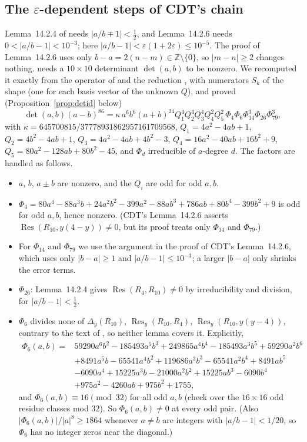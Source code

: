 \documentclass[11pt]{amsart}
\theoremstyle{definition}
\theoremstyle{remark}
\numberwithin{equation}{section}
\newcommand{\ZZ}{\mathbb{Z}}
\newcommand{\Res}{\operatorname{Res}}
\begin{document}
\subsection{The \texorpdfstring{$\varepsilon$}{epsilon}-dependent steps of CDT's chain}\label{sec:phi6}
Lemma~14.2.4 of \cite{CDT} needs $|a/b\mp1|<\frac12$, and Lemma~14.2.6 needs $0<|a/b-1|<10^{-3}$; here
$|a/b-1|<\varepsilon(1+2\varepsilon)\le10^{-5}$. The proof of Lemma~14.2.6 uses only $b-a=2(n-m)\in\ZZ\setminus\{0\}$, so
$|m-n|\ge2$ changes nothing. \cite[Lemma~14.3.1]{CDT} needs a $10\times10$ determinant $\det(a,b)$ to be nonzero. We
recomputed it exactly from the operator of \cite[Prop.~14.1.11]{CDT} and the reduction \cite[(14.3.2)--(14.3.5)]{CDT},
with numerators $S_k$ of the shape \cite[(14.3.6)]{CDT} (one for each basis vector of the unknown $Q$), and proved (Proposition~\ref{prop:detid} below)
\[
\det(a,b)(a-b)^{86}=\kappa\,a^6b^6(a+b)^{24}Q_1^4Q_2^4Q_3^4Q_4^2Q_5^2\,\Phi_4\Phi_6\Phi_{14}^3\Phi_{26}\Phi_{79}^3,
\]
with $\kappa=645700815/37778931862957161709568$, $Q_1=4a^2-4ab+1$, $Q_2=4b^2-4ab+1$, $Q_3=4a^2-4ab+4b^2-3$,
$Q_4=16a^2-40ab+16b^2+9$, $Q_5=80a^2-128ab+80b^2-45$, and $\Phi_d$ irreducible of $a$-degree $d$. The factors are handled as follows.
\begin{itemize}
\item $a$, $b$, $a\pm b$ are nonzero, and the $Q_i$ are odd for odd $a,b$.
\item $\Phi_4=80a^4-88a^3b+24a^2b^2-399a^2-88ab^3+786ab+80b^4-399b^2+9$ is odd for odd $a,b$, hence nonzero. (CDT's
Lemma~14.2.6 asserts $\Res(R_{10},y(4-y))\ne0$, but its proof treats only $\Phi_{14}$ and $\Phi_{79}$.)
\item For $\Phi_{14}$ and $\Phi_{79}$ we use the argument in the proof of CDT's Lemma~14.2.6, which uses only
$|b-a|\ge1$ and $|a/b-1|\le10^{-3}$; a larger $|b-a|$ only shrinks the error terms.
\item $\Phi_{26}$: Lemma~14.2.4 gives $\Res(R_4,R_{10})\ne0$ by irreducibility and division, for $|a/b-1|<\frac12$.
\item $\Phi_6$ divides none of $\Delta_y(R_{10})$, $\Res_y(R_{10},R_4)$, $\Res_y(R_{10},y(y-4))$, contrary to the text of
\cite{CDT}, so neither lemma covers it. Explicitly,
\[
\begin{aligned}
\Phi_6(a,b)={}&59290a^6b^2-185493a^5b^3+249865a^4b^4-185493a^3b^5+59290a^2b^6\\
&+8491a^5b-65541a^4b^2+119686a^3b^3-65541a^2b^4+8491ab^5\\
&-6090a^4+15225a^3b-21000a^2b^2+15225ab^3-6090b^4\\
&+975a^2-4260ab+975b^2+1755,
\end{aligned}
\]
and $\Phi_6(a,b)\equiv16\pmod{32}$ for all odd $a,b$ (check over the $16\times16$ odd residue classes mod $32$). So
$\Phi_6(a,b)\ne0$ at every odd pair. (Also $|\Phi_6(a,b)|/|a|^8\ge1864$ whenever $a\ne b$ are integers with
$|a/b-1|<1/20$, so $\Phi_6$ has no integer zeros near the diagonal.)
\end{itemize}
\end{document}
